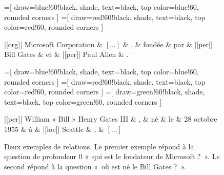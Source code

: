 \documentclass[PhD-Yoann-Dupont.tex]{subfiles}
\begin{document}
\begin{figure}[ht!]
\centering
    \begin{dependency}[theme=default]
        =[
            draw=blue!60!black, shade, text=black,
            top color=blue!60, rounded corners
        ]
        =[
            draw=red!60!black, shade, text=black,
            top color=red!60, rounded corners
        ]
        \begin{deptext}[column sep=1.0em]
             |[org]| Microsoft Corporation \& $[...]$ \& , \& fondée \& par \& |[per]| Bill Gates \& et \& |[per]| Paul Allen \& . \\
        \end{deptext}
    \end{dependency}
    
    \begin{dependency}[theme=default]
        =[
            draw=blue!60!black, shade, text=black,
            top color=blue!60, rounded corners
        ]
        =[
            draw=red!60!black, shade, text=black,
            top color=red!60, rounded corners
        ]
        =[
            draw=green!60!black, shade, text=black,
            top color=green!60, rounded corners
        ]
        \begin{deptext}[column sep=0.75em]  
             |[per]| William « Bill » Henry Gates III \& , \& né \& le \& 28 octobre 1955 \& à \& |[loc]| Seattle \& , \& $[...]$ \\
        \end{deptext}
    \end{dependency}
\caption{Deux exemples de relations. Le premier exemple répond à la question de profondeur 0 «\ qui est le fondateur de Microsoft ?\ ». Le second répond à la question «\ où est né le Bill Gates ?\ ».}
\label{fig:relation-extraction-example}
\end{figure}
\end{document}
